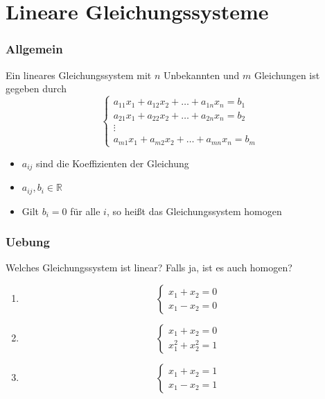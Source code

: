 \section{Lineare Gleichungssysteme}
\begin{frame}
    \frametitle{Allgemein}
    Ein lineares Gleichungssystem mit $n$ Unbekannten und $m$ Gleichungen ist gegeben durch
    \begin{equation*}
        \begin{cases}
            a_{11}x_1 + a_{12}x_2 + \dots + a_{1n}x_n = b_1 \\
            a_{21}x_1 + a_{22}x_2 + \dots + a_{2n}x_n = b_2 \\
            \vdots \\
            a_{m1}x_1 + a_{m2}x_2 + \dots + a_{mn}x_n = b_m
        \end{cases}
    \end{equation*}
    \begin{itemize}
        \item $a_{ij}$ sind die Koeffizienten der Gleichung
        \item $a_{ij},  b_i \in \mathbb{R}$
        \item Gilt $b_i = 0$ für alle $i$, so heißt das Gleichungssystem homogen
    \end{itemize}
\end{frame}

\begin{frame}
    \frametitle{Uebung}
    Welches Gleichungssystem ist linear?
    Falls ja, ist es auch homogen?
    \begin{enumerate}
        \item
        \begin{equation*}
            \begin{cases}
                x_1 + x_2 = 0 \\
                x_1 - x_2 = 0
            \end{cases}
        \end{equation*}
        \item
        \begin{equation*}
            \begin{cases}
                x_1 + x_2 = 0 \\
                x_1^2 + x_2^2 = 1
            \end{cases}
        \end{equation*}
        \item
        \begin{equation*}
            \begin{cases}
                x_1 + x_2 = 1 \\
                x_1 - x_2 = 1
            \end{cases}
        \end{equation*}
    \end{enumerate}
\end{frame}

